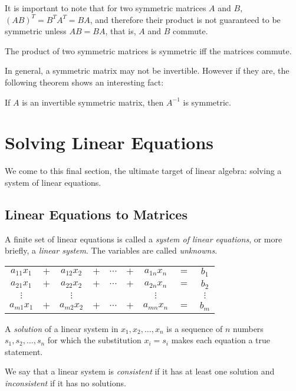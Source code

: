 \documentclass{report}
\begin{document}
		It is important to note that for two symmetric matrices $A$ and $B$, $(AB)^T=B^TA^T=BA$, and therefore their product is not guaranteed to be symmetric unless $AB=BA$, that is, $A$ and $B$ commute.
		
		\begin{thm}
			The product of two symmetric matrices is symmetric iff the matrices commute.
		\end{thm}
		
		In general, a symmetric matrix may not be invertible. However if they are, the following theorem shows an interesting fact:
		
		\begin{thm}
			If $A$ is an invertible symmetric matrix, then $A^{-1}$ is symmetric.
		\end{thm}
	
	\section{Solving Linear Equations}
	We come to this final section, the ultimate target of linear algebra: solving a system of linear equations.
		\subsection{Linear Equations to Matrices}
		A finite set of linear equations is called a \emph{system of linear equations}, or more briefly, a \emph{linear system}. The variables are called \emph{unknowns}.
		
		\begin{center}
			\begin{tabular}{ccccccccc}
				$a_{11}x_1$ & $+$ & $a_{12}x_2$ & $+$ & $\cdots$ & $+$ & $a_{1n}x_n$ & $=$ & $b_1$    \\
				$a_{21}x_1$ & $+$ & $a_{22}x_2$ & $+$ & $\cdots$ & $+$ & $a_{2n}x_n$ & $=$ & $b_2$    \\
				$\vdots$    &     & $\vdots$   &     &          &     & $\vdots$    &     & $\vdots$ \\
				$a_{m1}x_1$ & $+$ & $a_{m2}x_2$ & $+$ & $\cdots$ & $+$ & $a_{mn}x_n$ & $=$ & $b_m$   
			\end{tabular}
		\end{center}
		
		A \emph{solution} of a linear system in $x_1,x_2,\dots,x_n$ is a sequence of $n$ numbers $s_1,s_2,\dots,s_n$ for which the substitution $x_i=s_i$ makes each equation a true statement.
		
		We say that a linear system is \emph{consistent} if it has at least one solution and \emph{inconsistent} if it has no solutions.
		
\end{document}
